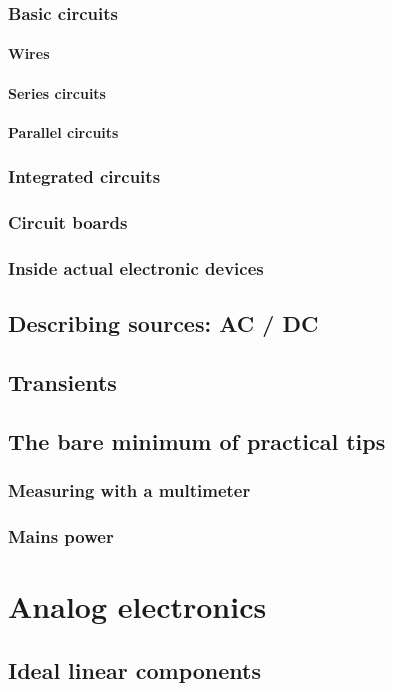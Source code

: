\documentclass{report}
\begin{document}
\section{Basic circuits}
\subsection{Wires}
\subsection{Series circuits}
\subsection{Parallel circuits}
\section{Integrated circuits}
\section{Circuit boards}
\section{Inside actual electronic devices}
\chapter{Describing sources: AC / DC}

\chapter{Transients}
\chapter{The bare minimum of practical tips}
\section{Measuring with a multimeter}
\section{Mains power}

\part{Analog electronics}
\chapter{Ideal linear components}
\end{document}
